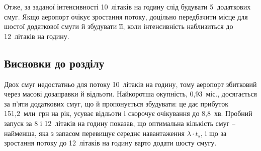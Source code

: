 Отже, за заданої інтенсивності 10~літаків на годину слід будувати 5~додаткових смуг. Якщо аеропорт очікує зростання потоку, доцільно передбачити місце для шостої додаткової смуги й збудувати її, коли інтенсивність наблизиться до 12~літаків на годину.

\subsection{Висновки до розділу}

Двох смуг недостатньо для потоку 10~літаків на годину, тому аеропорт збитковий через масові дозаправки й відльоти. Найкоротша окупність, 0,93~міс., досягається за п'яти додаткових смуг, що й пропонується збудувати: це дає прибуток 151,2~млн~грн на рік, усуває відльоти і скорочує очікування до 8,8~хв. Пробний запуск за 8 і 12~літаків на годину показав, що оптимальна кількість смуг -- найменша, яка з запасом перевищує середнє навантаження $\lambda \cdot t_s$, і що за зростання потоку до 12~літаків на годину варто додати шосту смугу.
